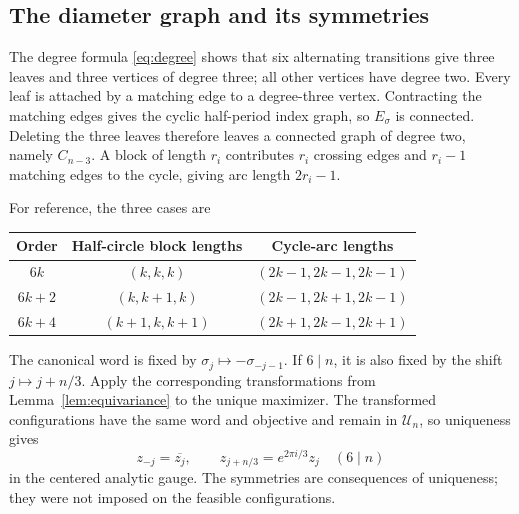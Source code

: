 \documentclass[11pt,reqno]{amsart}
\numberwithin{equation}{section}
\theoremstyle{definition}
\theoremstyle{remark}
\newcommand{\UU}{\mathscr U_n}
\begin{document}
\subsection{The diameter graph and its symmetries}
The degree formula \eqref{eq:degree} shows that six alternating transitions give three leaves and three vertices of degree three; all other vertices have degree two. Every leaf is attached by a matching edge to a degree-three vertex. Contracting the matching edges gives the cyclic half-period index graph, so $E_\sigma$ is connected. Deleting the three leaves therefore leaves a connected graph of degree two, namely $C_{n-3}$. A block of length $r_i$ contributes $r_i$ crossing edges and $r_i-1$ matching edges to the cycle, giving arc length $2r_i-1$.

For reference, the three cases are
\begin{center}
\begin{tabular}{@{}ccc@{}}
\toprule
Order & Half-circle block lengths & Cycle-arc lengths\\
\midrule
$6k$ & $(k,k,k)$ & $(2k-1,2k-1,2k-1)$\\
$6k+2$ & $(k,k+1,k)$ & $(2k-1,2k+1,2k-1)$\\
$6k+4$ & $(k+1,k,k+1)$ & $(2k+1,2k-1,2k+1)$\\
\bottomrule
\end{tabular}
\end{center}

The canonical word is fixed by $\sigma_j\mapsto-\sigma_{-j-1}$. If $6\mid n$, it is also fixed by the shift $j\mapsto j+n/3$. Apply the corresponding transformations from Lemma~\ref{lem:equivariance} to the unique maximizer. The transformed configurations have the same word and objective and remain in $\UU$, so uniqueness gives
\begin{equation}\label{eq:symmetries}
 z_{-j}=\overline{z_j},\qquad
 z_{j+n/3}=e^{2\pi i/3}z_j\quad(6\mid n)
\end{equation}
in the centered analytic gauge. The symmetries are consequences of uniqueness; they were not imposed on the feasible configurations.
\end{document}
